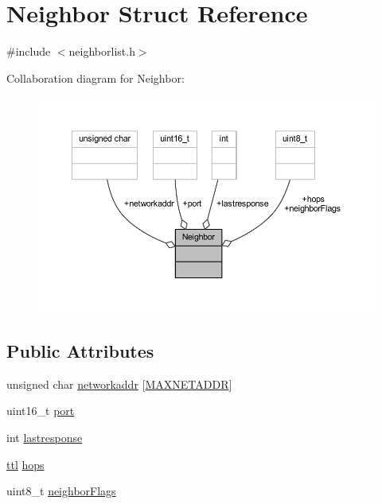 \hypertarget{struct_neighbor}{}\section{Neighbor Struct Reference}
\label{struct_neighbor}


{\ttfamily \#include $<$neighborlist.\+h$>$}



Collaboration diagram for Neighbor\+:
\nopagebreak
\begin{figure}[H]
\begin{center}
\leavevmode
\includegraphics[width=350pt]{struct_neighbor__coll__graph}
\end{center}
\end{figure}
\subsection*{Public Attributes}
\begin{DoxyCompactItemize}
\item 
unsigned char \hyperlink{struct_neighbor_a6bc80628de6e4c9aeff5110d6deef9d4}{networkaddr} \mbox{[}\hyperlink{packet_8h_a64e48eb75238bd3d7a053f19071044a8}{M\+A\+X\+N\+E\+T\+A\+D\+DR}\mbox{]}
\item 
uint16\+\_\+t \hyperlink{struct_neighbor_a18b5cd42623d929f155daa37b6b1bff1}{port}
\item 
int \hyperlink{struct_neighbor_ab27726b4b15f950aeba7525de9f5fa02}{lastresponse}
\item 
\hyperlink{packet_8h_a22ca626eb8f0deb847d1fae89476e26d}{ttl} \hyperlink{struct_neighbor_a1b3e73523c604b66fb9674dcf1ffade7}{hops}
\item 
uint8\+\_\+t \hyperlink{struct_neighbor_ae2738c5549836389e9d6c0e8f78df134}{neighbor\+Flags}
\end{DoxyCompactItemize}


